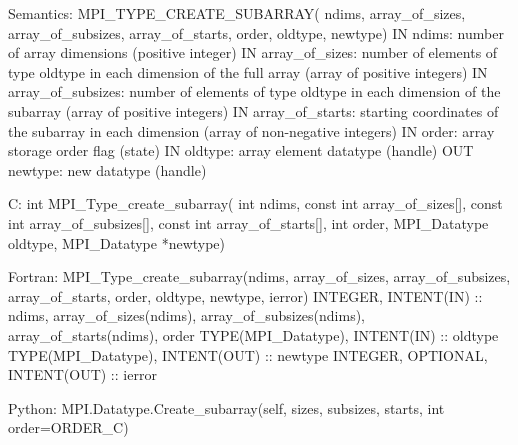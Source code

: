 Semantics:
MPI_TYPE_CREATE_SUBARRAY(
    ndims, array_of_sizes, array_of_subsizes,
    array_of_starts, order, oldtype, newtype)
IN ndims: number of array dimensions (positive integer)
IN array_of_sizes: number of elements of type oldtype in each dimension
    of the full array (array of positive integers)
IN array_of_subsizes: number of elements of type oldtype in each
    dimension of the subarray (array of positive integers)
IN array_of_starts: starting coordinates of the subarray in each
    dimension (array of non-negative integers)
IN order: array storage order flag (state)
IN oldtype: array element datatype (handle)
OUT newtype: new datatype (handle)

C:
int MPI_Type_create_subarray(
    int ndims, const int array_of_sizes[],
    const int array_of_subsizes[], const int array_of_starts[],
    int order, MPI_Datatype oldtype, MPI_Datatype *newtype)

Fortran:
MPI_Type_create_subarray(ndims, array_of_sizes, array_of_subsizes,
    array_of_starts, order, oldtype, newtype, ierror)
INTEGER, INTENT(IN) :: ndims, array_of_sizes(ndims),
    array_of_subsizes(ndims), array_of_starts(ndims), order
TYPE(MPI_Datatype), INTENT(IN) :: oldtype
TYPE(MPI_Datatype), INTENT(OUT) :: newtype
INTEGER, OPTIONAL, INTENT(OUT) :: ierror

Python:
MPI.Datatype.Create_subarray(self, sizes, subsizes, starts, int order=ORDER_C)
